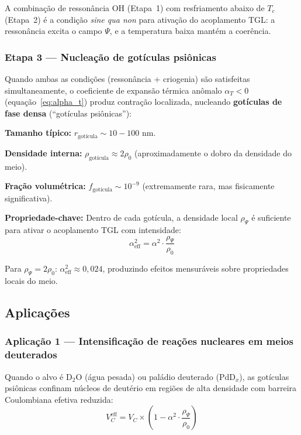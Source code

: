 \documentclass[12pt,a4paper]{article}
\newcommand{\alphaii}{\alpha^2}
\newcommand{\rhoPsi}{\rho_\Psi}
\newcommand{\Tcrit}{T_c}
\begin{document}
A combinação de ressonância OH (Etapa~1) com resfriamento
abaixo de $\Tcrit$ (Etapa~2) é a condição \textit{sine qua non}
para ativação do acoplamento TGL: a ressonância excita o campo
$\Psi$, e a temperatura baixa mantém a coerência.

\subsubsection{Etapa 3 --- Nucleação de gotículas psiônicas}

Quando ambas as condições (ressonância + criogenia) são
satisfeitas simultaneamente, o coeficiente de expansão térmica
anômalo $\alpha_T < 0$ (equação~\ref{eq:alpha_t}) produz
contração localizada, nucleando \textbf{gotículas de fase
densa} (``gotículas psiônicas''):

\textbf{Tamanho típico:} $r_{\text{gotícula}} \sim 10 -
100$ nm.

\textbf{Densidade interna:} $\rho_{\text{gotícula}} \approx
2\rho_0$ (aproximadamente o dobro da densidade do meio).

\textbf{Fração volumétrica:} $f_{\text{gotícula}} \sim
10^{-9}$ (extremamente rara, mas fisicamente significativa).

\textbf{Propriedade-chave:} Dentro de cada gotícula, a
densidade local $\rhoPsi$ é suficiente para ativar o
acoplamento TGL com intensidade:
\begin{equation}
\alphaii_{\text{eff}} = \alphaii \cdot
  \frac{\rhoPsi}{\rho_0}
\label{eq:alpha_eff}
\end{equation}

Para $\rhoPsi = 2\rho_0$: $\alphaii_{\text{eff}} \approx
0{,}024$, produzindo efeitos mensuráveis sobre propriedades
locais do meio.

\subsection{Aplicações}

\subsubsection{Aplicação 1 --- Intensificação de reações
nucleares em meios deuterados}

Quando o alvo é D$_2$O (água pesada) ou paládio deuterado
(PdD$_x$), as gotículas psiônicas confinam núcleos de deutério
em regiões de alta densidade com barreira Coulombiana efetiva
reduzida:
\begin{equation}
V_C^{\text{eff}} = V_C \times \left(1 - \alphaii \cdot
  \frac{\rhoPsi}{\rho_0}\right)
\label{eq:barreira}
\end{equation}
\end{document}

